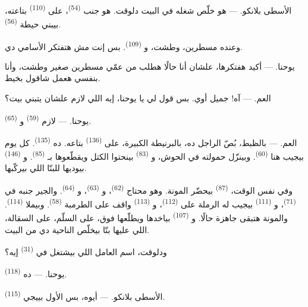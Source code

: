\textsc{الأسطى بلانكو}. --- هو خلّص شغله في البيت دلوقت. هو جنب
 \textsuperscript{(54)}، على  \textsuperscript{(110)} بتاعته،
بيبني حيطة  \textsuperscript{(56)}.

وعنده مسطرين، وطشت، و \textsuperscript{(109)}. بس إنت مش هتفتكر الأسامي دي.

\textsc{يوحنا}. --- أكيد هفتكرها، علشان أنا حالًا هطلب من عمّي مسطرين صغير
وطشت، وأنا بنفسي هعمل شاقول بخيط.

\VUsaut{3.0mm}
\VUsaut{3.0mm}

\textsc{العم}. --- آه! جميل أوي. بس قول لي يا يوحنا، إيه اللي لازم علشان يتبني
بيت؟

\textsc{يوحنا}. --- لازم  \textsuperscript{(59)} و
\textsuperscript{(65)}.

\textsc{العم}. --- بالظبط، بُصّ الراجل ده، بالبرنيطة الكبيرة، على
 \textsuperscript{(136)} بتاعه. ده  \textsuperscript{(135)}.
كل يوم
بيجيب هنا  \textsuperscript{(60)}. وبينزّل حمولته في الحوش،
و \textsuperscript{(83)} بينحتوا الكتل ويقطّعوها بـ
\textsuperscript{(85)}. و \textsuperscript{(146)} بيوديها للبنّا اللي
بيركّبها.

وفي نفس الوقت،  \textsuperscript{(87)} بيحضّر المونة. وهو محتاج
 \textsuperscript{(62)}، و \textsuperscript{(63)}، و
\textsuperscript{(64)}. والجير جنبه في  \textsuperscript{(71)}، و \textsuperscript{(111)} بيجيب له الرملة على 
\textsuperscript{(112)}، و \textsuperscript{(113)} واقف على الطرمبة
\textsuperscript{(58)}. وبيملا  \textsuperscript{(114)}. والمونة هتبقى جاهزة
حالًا. و \textsuperscript{(107)} بياخدها ويطلّعها فوق، على السلّم،
على السقالة، اللي عليها بنّا بيخلّص الناحية دي من البيت.

ودلوقت، اسم العامل اللي بيشتغل في  \textsuperscript{(31)} إيه؟

\textsc{يوحنا}. --- ده  \textsuperscript{(118)}.

\VUsaut{3.0mm}
\VUsaut{3.0mm}

\textsc{الأسطى بلانكو}. --- أيوه، بس الأول بييجي 
\textsuperscript{(115)}.

